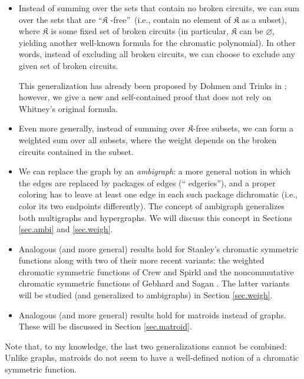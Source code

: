 \documentclass[numbers=enddot,12pt,final,onecolumn,notitlepage]{scrartcl}%
\theoremstyle{definition}
\begin{document}
\begin{itemize}
\item Instead of summing over the sets that contain no broken circuits, we can
sum over the sets that are \textquotedblleft$\mathfrak{K}$%
-free\textquotedblright\ (i.e., contain no element of $\mathfrak{K}$ as a
subset), where $\mathfrak{K}$ is some fixed set of broken circuits (in
particular, $\mathfrak{K}$ can be $\varnothing$, yielding another well-known
formula for the chromatic polynomial). In other words, instead of excluding
all broken circuits, we can choose to exclude any given set of broken circuits.

This generalization has already been proposed by Dohmen and Trinks in
\cite[\S 3.1]{DohTri14}; however, we give a new and self-contained proof that
does not rely on Whitney's original formula.

\item Even more generally, instead of summing over $\mathfrak{K}$-free
subsets, we can form a weighted sum over all subsets, where the weight depends
on the broken circuits contained in the subset.

\item We can replace the graph by an \emph{ambigraph}: a more general notion
in which the edges are replaced by packages of edges (\textquotedblleft
edgeries\textquotedblright), and a proper coloring has to leave at least one
edge in each such package dichromatic (i.e., color its two endpoints
differently). The concept of ambigraph generalizes both multigraphs and
hypergraphs. We will discuss this concept in Sections \ref{sec.ambi} and
\ref{sec.weigh}.

\item Analogous (and more general) results hold for Stanley's chromatic
symmetric functions \cite{Stanley-chsym} along with two of their more recent
variants: the weighted chromatic symmetric functions of Crew and Spirkl
\cite{CreSpi19} and the noncommutative chromatic symmetric functions of
Gebhard and Sagan \cite{GebSag01}. The latter variants will be studied (and
generalized to ambigraphs) in Section \ref{sec.weigh}.

\item Analogous (and more general) results hold for matroids instead of
graphs. These will be discussed in Section \ref{sec.matroid}.
\end{itemize}

Note that, to my knowledge, the last two generalizations cannot be combined:
Unlike graphs, matroids do not seem to have a well-defined notion of a
chromatic symmetric function.
\end{document}
